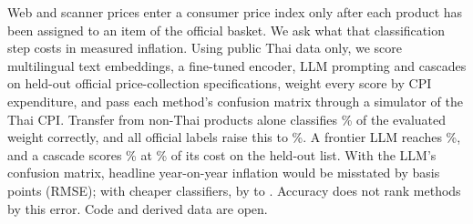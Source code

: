 Web and scanner prices enter a consumer price index only after each product has been
assigned to an item of the official basket. We ask what that classification step costs in
measured inflation. Using public Thai data only, we score multilingual text embeddings, a
fine-tuned encoder, LLM prompting and cascades on \NRefSpecs{} held-out official
price-collection specifications, weight every score by CPI expenditure, and pass each
method's confusion matrix through a simulator of the Thai CPI. Transfer from non-Thai
products alone classifies \AccWEfiveMLPZeroShot\% of the evaluated weight correctly, and all
official labels raise this to \AccWEfiveMLP\%. A frontier LLM reaches \AccWOpus\%, and a cascade
scores \AccWCasEfiveMLPOpus\% at \CostPctCasEfiveMLPOpus\% of its cost on the held-out list. With the LLM's confusion matrix, headline
year-on-year inflation would be misstated by \BpYoyRmseHeadlineOpus{} basis points (RMSE);
with cheaper classifiers, by \BpYoyRmseHeadlineBgeMLP{} to \BpYoyRmseHeadlineEfiveMLP. Accuracy does not rank methods by
this error. Code and derived data are open.
